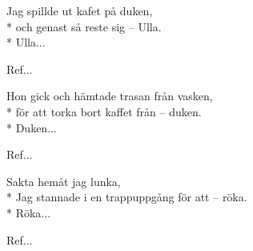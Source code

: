 \begin{SongText}
    \begin{SongVerse}
        Jag spillde ut kafet på duken,\\*%
        och genast så reste sig – Ulla.\\*%
        Ulla...
    \end{SongVerse}
    \begin{SongVerse}
        Ref...
    \end{SongVerse}
    \begin{SongVerse}
        Hon gick och hämtade trasan från vasken,\\*%
        för att torka bort kaffet från – duken.\\*%
        Duken...
    \end{SongVerse}
    \begin{SongVerse}
        Ref...
    \end{SongVerse}
    \begin{SongVerse}
        Sakta hemåt jag lunka,\\*%
        Jag stannade i en trappuppgång för att – röka.\\*%
        Röka...
    \end{SongVerse}
    \begin{SongVerse}
        Ref...
    \end{SongVerse}
\end{SongText}
